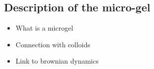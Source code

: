 \documentclass[../../main-notes.tex]{subfiles}
\begin{document}
\subsection{Description of the micro-gel}

\begin{itemize}
    \item What is a microgel
    \item Connection with colloids 
    \item Link to brownian dynamics
\end{itemize}


\citep{priyaComprehensiveReviewHydrogel2024}

\begin{comment}
Hydrogels possess several distinctive characteristics, making them highly valuable for various biomedical applications. 
These characteristics include biodegradability, biocompatibility, hydrophilicity, super absorbency, viscoelasticity, softness, and fluffiness. 
Furthermore, hydrogels are responsive to various stimuli, which adds versatility to their applications. 
These stimuli can include temperature, electric field, magnetic field, biological molecules, and ionic strength [11,12]. 
This resemblance to the extracellular matrix, along with their biocompatibility and biodegradability, makes them ideal for creating scaffolds to support tissue regeneration and growth. 
However, traditional hydrogels struggle to combine electrical conductivity, strong adhesion, and mechanical performance.
Designing hydrogels that adhere well to various surfaces while maintaining these properties is a significant challenge.

The ability of hydrogels to create functional replacement tissues and organs holds immense promise for treating a wide range of injuries and diseases [1–5]. 
This includes advances in biomaterials science, 3D printing, stem cell technology, and bio fabrication methods.
hydrogel materials are used to support the development of new cells and promote repair. 
Normally, metal-based materials, chitosan, cellulose, and hydrogel materials are used for biomedical applications.
They are used in dye and heavy metal adsorption, biosensors, and medical coatings. 
They are highly biocompatible and can mimic the properties of natural extracellular matrices. 
In tissue engineering, hydrogels serve as excellent biomaterials since they can mimic the natural water and polymer environment found in biological systems [9]. 

Hydrogels have gained popularity for their solubility, water retention, and wet environment compatibility. 
In general, hydrogel has large amounts of water, and it is one of the three-dimensional hydrophilic polymers [8]. 



\end{comment}
\end{document}

